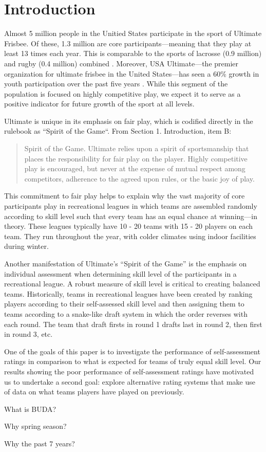 \section{Introduction}

Almost 5 million people in the Unitied States participate in the sport of Ultimate Frisbee.  Of these, 1.3 million are core participants---meaning that they play at least 13 times each year.  This is comparable to the sports of lacrosse (0.9 million) and rugby (0.4 million) combined \cite{sfia_2016}. Moreover, USA Ultimate---the premier organization for ultimate frisbee in the United States---has seen a 60\% growth in youth participation over the past five years \cite{usau_2016}.  While this segment of the population is focused on highly competitive play, we expect it to serve as a positive indicator for future growth of the sport at all levels.

Ultimate is unique in its emphasis on fair play, which is codified directly in the rulebook as ``Spirit of the Game``.  From Section 1. Introduction, item B:

\begin{quote} Spirit of the Game. Ultimate relies upon a spirit of sportsmanship that places the responsibility for fair play on the player. Highly competitive play is encouraged, but never at the expense of mutual respect among competitors, adherence to the agreed upon rules, or the basic joy of play.
\end{quote}

This commitment to fair play helps to explain why the vast majority of core participants play in recreational leagues in which teams are assembled randomly according to skill level such that every team has an equal chance at winning---in theory.  These leagues typically have 10 - 20 teams with 15 - 20 players on each team.  They run throughout the year, with colder climates using indoor facilities during winter.

Another manifestation of Ultimate's ``Spirit of the Game'' is the emphasis on individual assessment when determining skill level of the participants in a recreational league.  A robust measure of skill level is critical to creating balanced teams.  Historically, teams in recreational leagues have been created by ranking players according to their self-assessed skill level and then assigning them to teams according to a snake-like draft system in which the order reverses with each round.  The team that draft firsts in round 1 drafts last in round 2, then first in round 3, etc.

One of the goals of this paper is to investigate the performance of self-assessment ratings in comparison to what is expected for teams of truly equal skill level.  Our results showing the poor performance of self-assessment ratings have motivated us to undertake a second goal: explore alternative rating systems that make use of data on what teams players have played on previously. 


What is BUDA?

Why spring season?

Why the past 7 years?